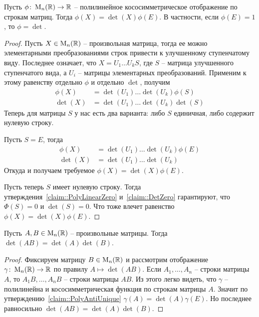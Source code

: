\begin{claim}
\label{claim::PolyAntiUnique}
Пусть $\phi\colon \operatorname{M}_{n}(\mathbb R)\to \mathbb R$ -- полилинейное кососимметрическое отображение по строкам матриц.
Тогда $\phi(X) = \det(X)\phi(E)$.
В частности, если $\phi(E) = 1$, то $\phi = \det$.
\end{claim}
\begin{proof}
Пусть $X\in\operatorname{M}_{n}(\mathbb R)$ -- произвольная матрица, тогда ее можно элементарными преобразованиями строк привести к улучшенному ступенчатому виду.
Последнее означает, что $X = U_1 \ldots U_k S$, где $S$ -- матрица улучшенного ступенчатого вида, а $U_i$ -- матрицы элементарных преобразований.
Применим к этому равенству отдельно $\phi$ и отдельно $\det$, получим
\begin{align*}
\phi(X) &= \det(U_1)\ldots \det(U_k)\phi(S)\\
\det(X) &= \det(U_1)\ldots \det(U_k)\det(S)
\end{align*}
Теперь для матрицы $S$ у нас есть два варианта: либо $S$ единичная, либо содержит нулевую строку.

Пусть $S = E$, тогда
\begin{align*}
\phi(X) &= \det(U_1)\ldots \det(U_k)\phi(E)\\
\det(X) &= \det(U_1)\ldots \det(U_k)
\end{align*}
Откуда и получаем требуемое $\phi(X) = \det(X)\phi(E)$.

Пусть теперь $S$ имеет нулевую строку.
Тогда утверждения~\ref{claim::PolyLinearZero} и~\ref{claim::DetZero} гарантируют, что $\Phi(S) = 0$ и $\det(S) = 0$.
Что тоже влечет равенство $\phi(X) = \det(X)\phi(E)$.
\end{proof}

\begin{claim}
\label{claim::DetMulti}
Пусть $A,B\in\operatorname{M}_{n}(\mathbb R)$ -- произвольные матрицы.
Тогда $\det(AB) = \det(A)\det(B)$.
\end{claim}
\begin{proof}
Фиксируем матрицу $B\in\operatorname{M}_{n}(\mathbb R)$ и рассмотрим отображение $\gamma\colon \operatorname{M}_{n}(\mathbb R)\to \mathbb R$ по правилу $A\mapsto \det(AB)$.
Если $A_1,\ldots, A_n$ -- строки матрицы $A$, то $A_1B, \ldots, A_nB$ -- строки матрицы $AB$.
Из этого легко видеть, что $\gamma$ -- полилинейна и кососимметрическая функция по строкам матрицы $A$.
Значит по утверждению~\ref{claim::PolyAntiUnique} $\gamma(A) = \det(A)\gamma(E)$.
Но последнее равносильно $\det(AB) = \det(A)\det (B)$.
\end{proof}

